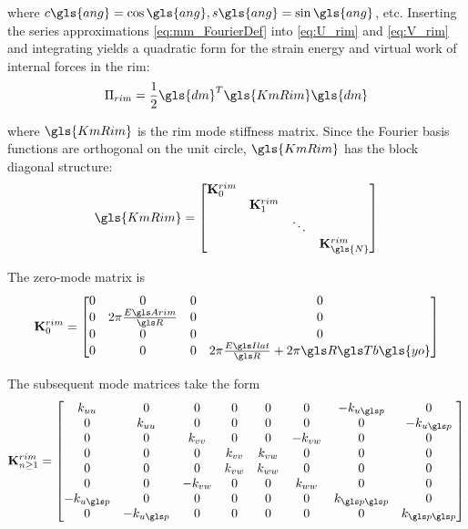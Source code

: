 \documentclass[\rootdir/thesis.tex]{subfiles}
\begin{document}
where $c\gls{ang}=\cos{\gls{ang}}, s\gls{ang}=\sin{\gls{ang}}$, etc. Inserting the series approximations \eqref{eq:mm_FourierDef} into \eqref{eq:U_rim} and \eqref{eq:V_rim} and integrating yields a quadratic form for the strain energy and virtual work of internal forces in the rim:
\begin{equation}
\label{eq:mm_U_rim}
\Pi_{rim} = \frac{1}{2} \gls{dm}^T \gls{KmRim} \gls{dm}
\end{equation}

where $\gls{KmRim}$ is the rim mode stiffness matrix. Since the Fourier basis functions are orthogonal on the unit circle, $\gls{KmRim}$ has the block diagonal structure:
\begin{equation}
\label{eq:mm_K_rim}
\gls{KmRim} =
\begin{bmatrix}
\mathbf{K}_0^{rim} & & &\\
& \mathbf{K}_1^{rim} & &\\
& & \ddots &\\
& & & \mathbf{K}_{\gls{N}}^{rim}
\end{bmatrix}
\end{equation}

The zero-mode matrix is
\begin{equation}
\mathbf{K}_0^{rim} =
\begin{bmatrix}
0 & 0 & 0 & 0\\
0 & 2\pi \frac{\EA}{\R} & 0 & 0\\
0 & 0 & 0 & 0\\
0 & 0 & 0 & 2\pi \frac{\EIl}{\R} + 2\pi \R\Tb\gls{yo}
\end{bmatrix}
\end{equation}

The subsequent mode matrices take the form
\begin{equation}
\mathbf{K}_{n\geq 1}^{rim} =
\begin{bmatrix}
k_{uu} & 0 & 0 & 0 & 0 & 0 & -k_{u\p} & 0\\
0 & k_{uu} & 0 & 0 & 0 & 0 & 0 & -k_{u\p}\\
0 & 0 & k_{vv} & 0 & 0 & -k_{vw} & 0 & 0\\
0 & 0 & 0 & k_{vv} & k_{vw} & 0 & 0 & 0\\
0 & 0 & 0 & k_{vw} & k_{ww} & 0 & 0 & 0\\
0 & 0 & -k_{vw} & 0 & 0 & k_{ww} & 0 & 0\\
-k_{u\p} & 0 & 0 & 0 & 0 & 0 & k_{\p\p} & 0\\
0 & -k_{u\p} & 0 & 0 & 0 & 0 & 0 & k_{\p\p}
\end{bmatrix}
\end{equation}
\end{document}
